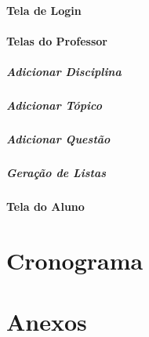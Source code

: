 \documentclass[12pt,oneside,a4paper,article]{abntex2}
\begin{document}
		\subsection{Tela de Login}
	
		\subsection{Telas do Professor}
			\subsubsection{Adicionar Disciplina}
			\subsubsection{Adicionar Tópico}
			\subsubsection{Adicionar Questão}
			\subsubsection{Geração de Listas}
		
		\subsection{Tela do Aluno}
		

\part{Cronograma}

\part*{Anexos}

\end{document}
